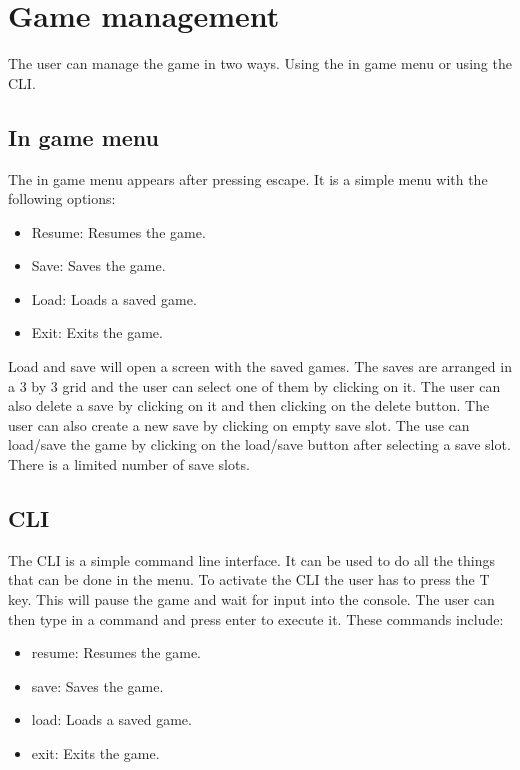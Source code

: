 \section{Game management}

The user can manage the game in two ways. 
Using the in game menu or using the CLI.

\subsection{In game menu}
The in game menu appears after pressing escape. 
It is a simple menu with the following options:

\begin{itemize}
    \item Resume: Resumes the game.
    \item Save: Saves the game.
    \item Load: Loads a saved game.
    \item Exit: Exits the game.
\end{itemize}

Load and save will open a screen with the saved games. 
The saves are arranged in a 3 by 3 grid and the user can select one of them by clicking on it. 
The user can also delete a save by clicking on it and then clicking on the delete button. 
The user can also create a new save by clicking on empty save slot.
The use can load/save the game by clicking on the load/save button after selecting a save slot.
There is a limited number of save slots.

\subsection{CLI}
The CLI is a simple command line interface.
It can be used to do all the things that can be done in the menu.
To activate the CLI the user has to press the T key.
This will pause the game and wait for input into the console.
The user can then type in a command and press enter to execute it.
These commands include:

\begin{itemize}
    \item resume: Resumes the game.
    \item save: Saves the game.
    \item load: Loads a saved game.
    \item exit: Exits the game.
\end{itemize}